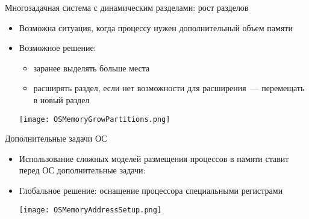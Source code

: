\documentclass[aspectratio=169,14pt]{beamer}
\begin{document}
\begin{frame}{Многозадачная система с динамическим разделами: рост разделов}
    \begin{itemize}
        \item Возможна ситуация, когда процессу нужен дополнительный
        объем памяти
        \item Возможное решение:
        \begin{itemize}
            \item заранее выделять больше места
            \item расширять раздел, если нет возможности для
            расширения~--- перемещать в новый раздел
        \end{itemize}
        \texttt{[image: OSMemoryGrowPartitions.png]}
    \end{itemize}
\end{frame}

\begin{frame}{Дополнительные задачи ОС}
    \begin{footnotesize}
    \begin{itemize}
        \item Использование сложных моделей размещения процессов в памяти
        ставит перед ОС дополнительные задачи:
        \begin{itemize}
        \end{itemize}
        \item Глобальное решение: оснащение процессора специальными
        регистрами
        \begin{itemize}
        \end{itemize}
        \texttt{[image: OSMemoryAddressSetup.png]}
    \end{itemize}
    \end{footnotesize}
\end{frame}
\end{document}
